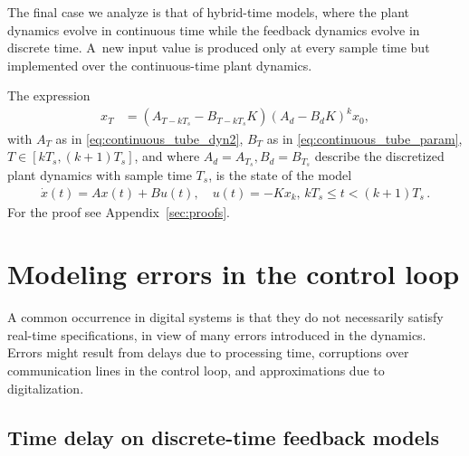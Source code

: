 \documentclass[a4paper,UKenglish]{lipics-v2018}
\newcommand{\mat}[1]{{#1}}
\renewcommand{\vec}[1]{{#1}}
\begin{document}
The final case we analyze is that of hybrid-time models, where the plant
dynamics evolve in continuous time while the feedback dynamics evolve in
discrete time.  A~new input value is produced only at every sample time but
implemented over the continuous-time plant dynamics.
%
\begin{theorem}
The expression
%
 \begin{align}
 \vec{x}_{T} &= (\mat{A}_{T-kT_s}-\mat{B}_{T-kT_s}\mat{K}) (\mat{A}_d-\mat{B}_d\mat{K})^k\vec{x}_0, 
 \label{eq:cyber_feedback}
 \end{align}
%
with $\mat{A}_T$ as in \eqref{eq:continuous_tube_dyn2}, $\mat{B}_T$ as in
\eqref{eq:continuous_tube_param}, $T \in [kT_s, (k+1)T_s]$, and where $\mat{A}_d=\mat{A}_{T_s},
\mat{B}_d=\mat{B}_{T_s}$ describe the discretized plant dynamics with
sample time $T_s$, is the state of the model
%
\begin{align*}
 \dot{\vec{x}}(t) = \mat{A}\vec{x}(t)+\mat{B}\vec{u}(t), \quad 
 \vec{u}(t)=-\mat{K}\vec{x}_k,  \,
 kT_s \leq t < (k+1)T_s \,. 
\end{align*}
%
For the proof see Appendix~\ref{sec:proofs}.
%
\end{theorem}

\section{Modeling errors in the control loop}\label{sec:errors}

A common occurrence in digital systems is that they do not necessarily
satisfy real-time specifications, in view of many errors introduced in the
dynamics.  Errors might result from delays due to processing time,
corruptions over communication lines in the control loop, and approximations
due to digitalization.

\subsection{Time delay on discrete-time feedback models} \label{sec:delay}
\end{document}
